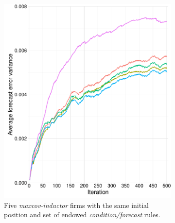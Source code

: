\documentclass[preprint, 12pt]{elsarticle}
\begin{document}
\begin{figure}[hb!]
	\caption{Average forecast error variance of all the activated \emph{condition/forecast} rules of the firms.}
	\centering
	
	\begin{subfigure}[t]{0.485\textwidth}
		\includegraphics[width=\textwidth, trim={4mm 0 0 0}]{Graphics/fig6a_mi_same.pdf}
		\caption{Five \emph{maxcov-inductor} firms with the same initial position and set of endowed \emph{condition/forecast} rules.}
		\label{fig:accuracy_maxcov}
	\end{subfigure}
	~
	\begin{subfigure}[t]{0.485\textwidth}

\end{subfigure}
\end{figure}
\end{document}
